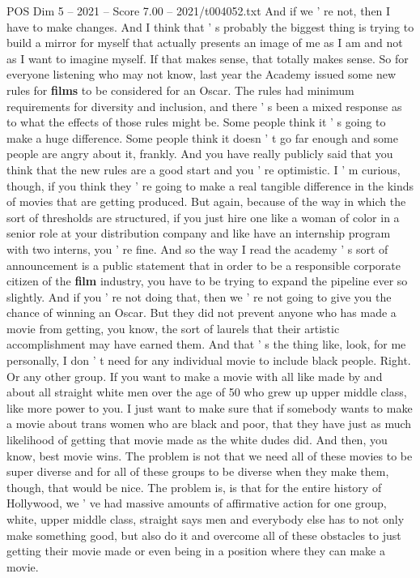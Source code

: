 \begin{textsample}{POS Dim 5 – 2021 – Score 7.00 – 2021/t004052.txt}
And if we ' re not, then I have to make changes.
And I think that ' s probably the biggest thing is trying to build a mirror for myself that actually presents an image of me as I am and not as I want to imagine myself.
If that makes sense, that totally makes sense.
So for everyone listening who may not know, last year the Academy issued some new rules for \textbf{films} to be considered for an Oscar.
The rules had minimum requirements for diversity and inclusion, and there ' s been a mixed response as to what the effects of those rules might be.
Some people think it ' s going to make a huge difference.
Some people think it doesn ' t go far enough and some people are angry about it, frankly.
And you have really publicly said that you think that the new rules are a good start and you ' re optimistic.
I ' m curious, though, if you think they ' re going to make a real tangible difference in the kinds of movies that are getting produced.
But again, because of the way in which the sort of thresholds are structured, if you just hire one like a woman of color in a senior role at your distribution company and like have an internship program with two interns, you ' re fine.
And so the way I read the academy ' s sort of announcement is a public statement that in order to be a responsible corporate citizen of the \textbf{film} industry, you have to be trying to expand the pipeline ever so slightly.
And if you ' re not doing that, then we ' re not going to give you the chance of winning an Oscar.
But they did not prevent anyone who has made a movie from getting, you know, the sort of laurels that their artistic accomplishment may have earned them.
And that ' s the thing like, look, for me personally, I don ' t need for any individual movie to include black people.
Right.
Or any other group.
If you want to make a movie with all like made by and about all straight white men over the age of 50 who grew up upper middle class, like more power to you.
I just want to make sure that if somebody wants to make a movie about trans women who are black and poor, that they have just as much likelihood of getting that movie made as the white dudes did.
And then, you know, best movie wins.
The problem is not that we need all of these movies to be super diverse and for all of these groups to be diverse when they make them, though, that would be nice.
The problem is, is that for the entire history of Hollywood, we ' ve had massive amounts of affirmative action for one group, white, upper middle class, straight says men and everybody else has to not only make something good, but also do it and overcome all of these obstacles to just getting their movie made or even being in a position where they can make a movie.

\end{textsample}
